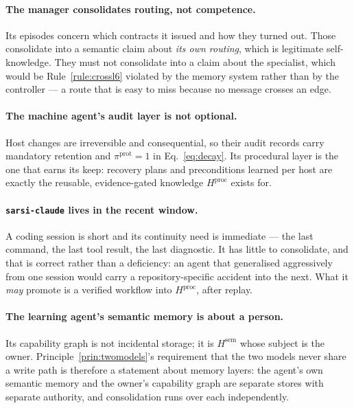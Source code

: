 \documentclass[11pt]{article}
\newcommand{\code}[1]{\texttt{\small #1}}
\begin{document}
\paragraph{The manager consolidates routing, not competence.} Its episodes concern which contracts it issued and how they turned out. Those consolidate into a semantic claim about \emph{its own routing}, which is legitimate self-knowledge. They must not consolidate into a claim about the specialist, which would be Rule~\ref{rule:crossl6} violated by the memory system rather than by the controller --- a route that is easy to miss because no message crosses an edge.

\paragraph{The machine agent's audit layer is not optional.} Host changes are irreversible and consequential, so their audit records carry mandatory retention and $\pi^{\mathrm{prot}}=1$ in Eq.~\eqref{eq:decay}. Its procedural layer is the one that earns its keep: recovery plans and preconditions learned per host are exactly the reusable, evidence-gated knowledge $H^{\mathrm{proc}}$ exists for.

\paragraph{\code{sarsi-claude} lives in the recent window.} A coding session is short and its continuity need is immediate --- the last command, the last tool result, the last diagnostic. It has little to consolidate, and that is correct rather than a deficiency: an agent that generalised aggressively from one session would carry a repository-specific accident into the next. What it \emph{may} promote is a verified workflow into $H^{\mathrm{proc}}$, after replay.

\paragraph{The learning agent's semantic memory is about a person.} Its capability graph is not incidental storage; it is $H^{\mathrm{sem}}$ whose subject is the owner. Principle~\ref{prin:twomodels}'s requirement that the two models never share a write path is therefore a statement about memory layers: the agent's own semantic memory and the owner's capability graph are separate stores with separate authority, and consolidation runs over each independently.
\end{document}
